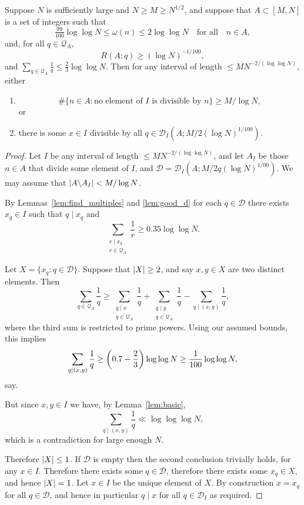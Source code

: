 \begin{proposition}\label{prop:tech_iterative2}
  \leanok
Suppose $N$ is sufficiently large and $N\geq M\geq N^{1/2}$, and suppose that $A\subset [M,N]$ is a set of integers such that
\[\tfrac{99}{100}\log\log N\leq \omega(n)\leq  2\log\log N\quad\textrm{for all}\quad n\in A,\]
and, for all $q\in \mathcal{Q}_A$,
\[R(A;q) \geq (\log N)^{-1/100},\]
and $\sum_{q\in\mathcal{Q}_A}\frac{1}{q}\leq \frac{2}{3}\log\log N$.
Then for any interval of length $\leq MN^{-2/(\log \log N)}$, either
\begin{enumerate}
\item \[\# \{ n\in A : \textrm{no element of }I\textrm{ is divisible by }n\}\geq M/\log N,\]
or
\item there is some $x\in I$ divisible by all $q\in\mathcal{D}_I(A;M/2(\log N)^{1/100})$.
\end{enumerate}
\end{proposition}
\begin{proof}
  \leanok
  Let $I$ be any interval of length $\leq MN^{-2/(\log\log N)}$, and let $A_I$ be those $n\in A$ that divide some element of $I$, and $\mathcal{D}=\mathcal{D}_I(A;M/2q(\log N)^{1/00})$. We may assume that $\left\lvert A\backslash A_I\right\rvert< M/\log N$.

  By Lemmas~\ref{lem:find_multiples} and \ref{lem:good_d} for each $q\in\mathcal{D}$ there exists $x_q\in I$ such that $q\mid x_q$ and
\[\sum_{\substack{r\mid x_q\\ r\in \mathcal{Q}_A}}\frac{1}{r}\geq 0.35\log\log N.\]



Let $X=\{x_q : q\in \mathcal{D}\}$. Suppose that $\left\lvert X\right\rvert\geq 2$, and say $x,y\in X$ are two distinct elements. Then
\[\sum_{q\in\mathcal{Q}_A}\frac{1}{q}\geq \sum_{\substack{q\mid x\\ q\in \mathcal{Q}_A}}\frac{1}{q}+\sum_{\substack{q\mid y\\ q\in \mathcal{Q}_A}}\frac{1}{q}-\sum_{q\mid (x,y)}\frac{1}{q},\]
where the third sum is restricted to prime powers. Using our assumed bounds, this implies
\[\sum_{q\mid (x,y)}\frac{1}{q}\geq \left( 0.7-\frac{2}{3}\right)\log\log N\geq \frac{1}{100}\log\log N,\]
say.

But since $x,y\in I$ we have, by Lemma~\ref{lem:basic},
  \[\sum_{q\mid (x,y)}\frac{1}{q}\ll \log\log\log N,\]
  which is a contradiction for large enough $N$.

Therefore $\left\lvert X\right\rvert\leq 1$. If $\mathcal{D}$ is empty then the second conclusion trivially holds, for any $x\in I$. Therefore there exists some $q\in \mathcal{D}$, therefore there exists some $x_q\in X$, and hence $\left\lvert X\right\rvert=1$. Let $x\in I$ be the unique element of $X$. By construction $x=x_q$ for all $q\in \mathcal{D}$, and hence in particular $q\mid x$ for all $q\in \mathcal{D}_I$ as required.
  \end{proof}

